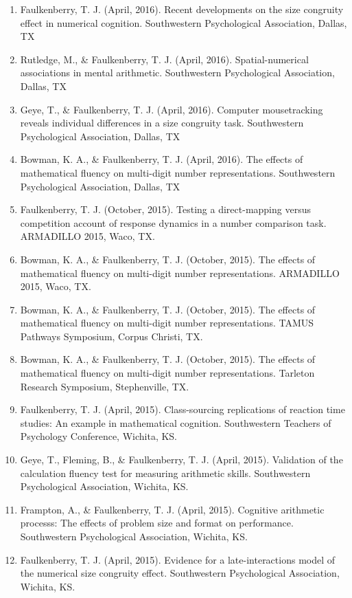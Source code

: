 \documentclass[article,10pt]{article}
\begin{document}
\begin{enumerate}
\item Faulkenberry, T. J. (April, 2016). Recent developments on the size congruity effect in numerical cognition. Southwestern Psychological Association, Dallas, TX
\item Rutledge, M., \& Faulkenberry, T. J. (April, 2016). Spatial-numerical associations in mental arithmetic. Southwestern Psychological Association, Dallas, TX
\item Geye, T., \& Faulkenberry, T. J. (April, 2016). Computer mousetracking reveals individual differences in a size congruity task. Southwestern Psychological Association, Dallas, TX
\item Bowman, K. A., \& Faulkenberry, T. J. (April, 2016). The effects of mathematical fluency on multi-digit number representations. Southwestern Psychological Association, Dallas, TX
\item Faulkenberry, T. J. (October, 2015). Testing a direct-mapping versus competition account of response dynamics in a number comparison task. ARMADILLO 2015, Waco, TX.
\item Bowman, K. A., \& Faulkenberry, T. J. (October, 2015). The effects of mathematical fluency on multi-digit number representations. ARMADILLO 2015, Waco, TX.
\item Bowman, K. A., \& Faulkenberry, T. J. (October, 2015). The effects of mathematical fluency on multi-digit number representations. TAMUS Pathways Symposium, Corpus Christi, TX.
\item Bowman, K. A., \& Faulkenberry, T. J. (October, 2015). The effects of mathematical fluency on multi-digit number representations. Tarleton Research Symposium, Stephenville, TX.
\item Faulkenberry, T. J. (April, 2015). Class-sourcing replications of reaction time studies: An example in mathematical cognition. Southwestern Teachers of Psychology Conference, Wichita, KS.
\item Geye, T., Fleming, B., \& Faulkenberry, T. J. (April, 2015). Validation of the calculation fluency test for measuring arithmetic skills. Southwestern Psychological Association, Wichita, KS.
\item Frampton, A., \& Faulkenberry, T. J. (April, 2015). Cognitive arithmetic processs: The effects of problem size and format on performance. Southwestern Psychological Association, Wichita, KS.
\item Faulkenberry, T. J. (April, 2015). Evidence for a late-interactions model of the numerical size congruity effect. Southwestern Psychological Association, Wichita, KS.

\end{enumerate}
\end{document}
